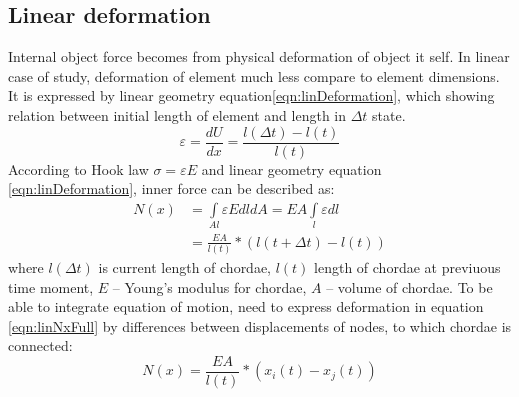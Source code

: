 \subsection*{Linear deformation}
Internal object force becomes from physical deformation of object it self. In
linear case of study, deformation of element much less compare to element
dimensions. It is expressed by linear geometry
equation\eqref{eqn:linDeformation}, which showing relation between initial
length of element and length in $\Delta t$ state.
\begin{equation}\label{eqn:linDeformation}
  \varepsilon=\frac{dU}{dx}=\frac{l(\Delta t)-l(t)}{l(t)}
\end{equation}
According to Hook law $\sigma=\varepsilon E$ and linear geometry equation
\eqref{eqn:linDeformation}, inner force can be described as:
\begin{equation}\label{eqn:linNxFull}
  \begin{split}
    N(x) &= \int\limits_{Al} \varepsilon EdldA=EA\int\limits_l \varepsilon dl \\
    &=\frac{EA}{l(t)}*(l(t + \Delta t)-l(t))
  \end{split}
\end{equation}
where $l(\Delta t)$ is current length of chordae, $l(t)$ length of chordae at
previuous time moment, $E$ – Young’s modulus for chordae, $A$ – volume of
chordae. To be able to integrate equation of motion, need to express deformation
in equation \eqref{eqn:linNxFull} by differences between displacements of nodes,
to which chordae is connected:
\begin{equation}\label{eqn:linNxWdispl}
  N(x)=\frac{EA}{l(t)}*(x_{i}(t)-x_{j}(t))
\end{equation}\par

